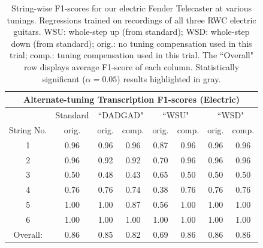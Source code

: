 \documentclass[12pt]{cmuthesis}
\begin{document}
\begin{table}[!htbp]
\begin{center}
\begin{tabular}{||c||c||c|c||c|c||c|c||}
\hline
\multicolumn{8}{|c|}{\bf{Alternate-tuning Transcription F1-scores (Electric)}} \\
\hline
& Standard & \multicolumn{2}{|c|}{``DADGAD"} & \multicolumn{2}{|c|}{``WSU"} & \multicolumn{2}{|c|}{``WSD"} \\
\hline
String No. & orig. & orig. & comp. & orig. & comp. & orig. & comp. \\
\hline
1 & 0.96 & 0.96 & 0.96 & 0.87 & 0.96 & 0.96 & 0.96 \\
\hline
2 & 0.96 & 0.92 & 0.92 & 0.70 & 0.96 & 0.96 & 0.96\\
\hline
3 & 0.50 & 0.48 & 0.43 & 0.65 & 0.50 & 0.50 & 0.50\\
\hline
4 & 0.76 & 0.76 & 0.74 & 0.38 & 0.76 & 0.76 & 0.76 \\
\hline
5 & 1.00 & 1.00 & 0.87 & 0.56 & 1.00 & 1.00 & 1.00 \\
\hline
6 & 1.00 & 1.00 & 1.00 & 1.00 & 1.00 & 1.00 & 1.00\\ 
\hline
\hline
Overall: & 0.86 & 0.85 & 0.82 &  \cellcolor[gray]{0.8}0.69 & \cellcolor[gray]{0.8}0.86 & 0.86 & 0.86\\
\hline
\end{tabular}
\caption{String-wise F1-scores for our electric Fender Telecaster at various tunings. Regressions trained on recordings of all three RWC electric guitars. WSU: whole-step up (from standard); WSD: whole-step down (from standard); orig.: no tuning compensation used in this trial; comp.: tuning compensation used in this trial. The ``Overall" row displays average F1-score of each column. Statistically significant ($\alpha=0.05$) results highlighted in gray.} 
\label{tab:resultsTune}
\end{center}
\end{table}
\end{document}
